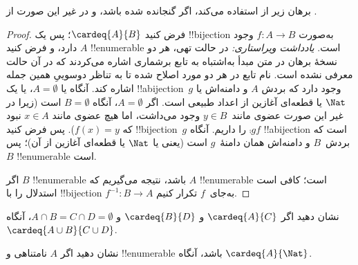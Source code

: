 \documentclass[../../../include/open-logic-section]{subfiles}
\begin{document}
\begin{editorial}
برهان زیر از  استفاده می‌کند، اگر
 گنجانده شده باشد، و در غیر این صورت از
.
\end{editorial}

\begin{proof}
فرض کنید $\cardeq{A}{B}$؛ پس یک !!{bijection} به‌صورت $f \colon A
\to B$ وجود دارد، و فرض کنید $A$ !!{enumerable} است.
\emph{یادداشت ویراستاری:} در حالت تهی، هر دو نسخهٔ برهان در متن مبدأ به‌اشتباه
به تابع برشماری اشاره می‌کردند که در آن حالت معرفی نشده است. نام تابع در
هر دو مورد اصلاح شده تا به تناظر دوسوییِ همین جمله اشاره کند.
{
  آنگاه یا $A  = \emptyset$، یا یک !!a{bijection}~$g$ وجود دارد که
  بردش $A$ و دامنه‌اش یا $\Nat$ یا قطعه‌ای آغازین از اعداد طبیعی
  است. اگر $A = \emptyset$، آنگاه $B =
  \emptyset$ است (زیرا در غیر این صورت عضوی مانند~$y \in B$ وجود می‌داشت، اما
  هیچ عضوی مانند $x
  \in A$ نبود که $f(x) = y$). پس فرض کنید !!{bijection}~$g$ را
  داریم. آنگاه $\comp{g}{f}$ !!a{bijection} است که بردش~$B$ و دامنه‌اش
  همان دامنهٔ~$g$ است (یعنی یا $\Nat$ یا قطعه‌ای آغازین از آن)؛ پس
  $B$ !!{enumerable} است.}

اگر $B$ !!{enumerable} باشد، نتیجه می‌گیریم که $A$ !!{enumerable} است؛
کافی است استدلال را با !!{bijection} $f^{-1}\colon B \to A$ به‌جای~$f$
تکرار کنیم.
\end{proof}

\begin{prob}
نشان دهید اگر $\cardeq{A}{C}$ و $\cardeq{B}{D}$ و $A \cap B =
C \cap D = \emptyset$، آنگاه $\cardeq{A \cup B}{C \cup D}$.
\end{prob}

\begin{prob}
نشان دهید اگر $A$ نامتناهی و !!{enumerable} باشد، آنگاه
$\cardeq{A}{\Nat}$.
\end{prob}
\end{document}
